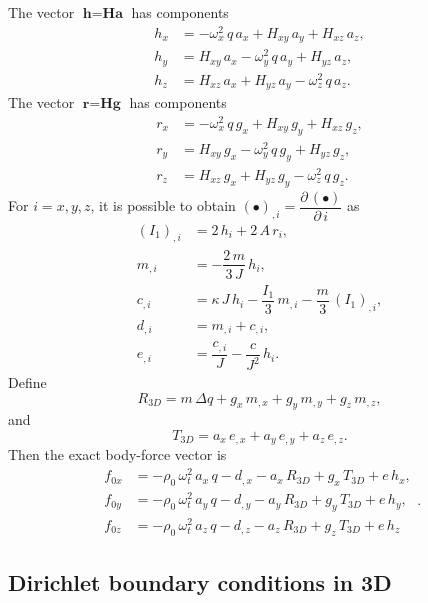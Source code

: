\documentclass[11pt,a4paper]{article}
\begin{document}
The vector $\textbf{h}=\textbf{H}\textbf{a}$ has components
%
\begin{align}
h_x&=-\omega_x^2\,q\,a_x+H_{xy}\,a_y+H_{xz}\,a_z,\\
h_y&=H_{xy}\,a_x-\omega_y^2\,q\,a_y+H_{yz}\,a_z,\\
h_z&=H_{xz}\,a_x+H_{yz}\,a_y-\omega_z^2\,q\,a_z.
\end{align}
%
The vector $\textbf{r}=\textbf{H}\textbf{g}$ has components
%
\begin{align}
r_x&=-\omega_x^2\,q\,g_x+H_{xy}\,g_y+H_{xz}\,g_z,\\
r_y&=H_{xy}\,g_x-\omega_y^2\,q\,g_y+H_{yz}\,g_z,\\
r_z&=H_{xz}\,g_x+H_{yz}\,g_y-\omega_z^2\,q\,g_z.
\end{align}
%
For $i=x,y,z$, it is possible to obtain $(\bullet)_{,i}=\dfrac{\partial\,(\bullet)}{\partial\,i}$ as
%
\begin{align}
(I_1)_{,i}&=2\,h_i+2\,A\,r_i,
\\
m_{,i}&=-\dfrac{2\,m}{3\,J}\,h_i,
\\
c_{,i}&=\kappa\, J\,h_i-\dfrac{I_1}{3}\,m_{,i}
-\dfrac{m}{3}\,(I_1)_{,i},
\\
d_{,i}&=m_{,i}+c_{,i},
\\
e_{,i}&=\dfrac{c_{,i}}{J}-\dfrac{c}{J^2}\,h_i.
\end{align}
%
Define
%
\begin{equation}
\boxed{
R_{3D}=m\,\Delta q+g_x\,m_{,x}+g_y\,m_{,y}+g_z\,m_{,z}
},
\end{equation}
%
and
%
\begin{equation}
\boxed{
T_{3D}=a_x\,e_{,x}+a_y\,e_{,y}+a_z\,e_{,z}
}.
\end{equation}
%
Then the exact body-force vector is
%
\begin{equation}
\boxed{
\begin{aligned}
f_{0x}&=-\rho_0\,\omega_t^2\,a_x\,q-d_{,x}-a_x\,R_{3D}+g_x\,T_{3D}+e\,h_x,
\\
f_{0y}&=-\rho_0\,\omega_t^2\,a_y\,q-d_{,y}-a_y\,R_{3D}+g_y\,T_{3D}+e\,h_y,
\\
f_{0z}&=-\rho_0\,\omega_t^2\,a_z\,q-d_{,z}-a_z\,R_{3D}+g_z\,T_{3D}+e\,h_z
\end{aligned}
}.
\label{eq_f3D}
\end{equation}


\subsection{Dirichlet boundary conditions in 3D}
\end{document}
